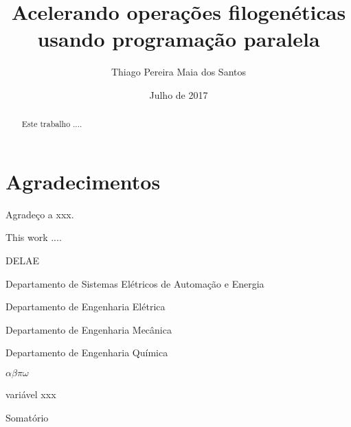 \documentclass{automatextcc}
\begin{document}
\title{Acelerando operações filogenéticas usando programação paralela}
\author{Thiago Pereira Maia dos Santos}

\dept{\DELAE}
\date{Julho de 2017}

\maketitle

\chapter*{Agradecimentos}
Agradeço a xxx.
\begin{abstract}
Este trabalho ....
\end{abstract}
\begin{englishabstract}
This work ....
\end{englishabstract}
\tableofcontents
\listoffigures
\listoftables
\begin{listofabbrv}{DELAE}
        \item[DELAE] Departamento de Sistemas Elétricos de Automação e Energia
        \item[DELET] Departamento de Engenharia Elétrica
        \item[DEMEC] Departamento de Engenharia Mecânica
        \item[DEQUI] Departamento de Engenharia Química
\end{listofabbrv}
\begin{listofsymbols}{$\alpha\beta\pi\omega$}
       \item[$\alpha\beta\pi\omega$] variável xxx
       \item[$\sum$] Somatório
\end{listofsymbols}
\end{document}
